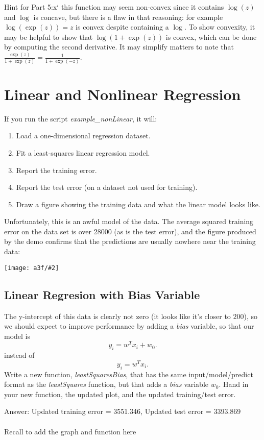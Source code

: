 \documentclass{article}
\def\ans#1{\par\gre{Answer: #1}}
\def\blu#1{{\color{blu}#1}}
\def\gre#1{{\color{gre}#1}}
\def\red#1{{\color{red}#1}}
\newcommand{\centerfig}[2]{\begin{center}\texttt{[image: a3f/\#2]}\end{center}}
\def\enum#1{\begin{enumerate}#1\end{enumerate}}
\begin{document}
Hint for Part 5:x`
this function may seem non-convex since it contains $\log(z)$ and $\log$ is concave, but there is a flaw in that reasoning: for example $\log(\exp(z))=z$ is convex despite containing a $\log$. To show convexity, it may be helpful to show that $\log(1+\exp(z))$ is convex, which can be done by computing the second derivative. It may simplify matters to note that $\frac{\exp(z)}{1+\exp(z)} = \frac{1}{1+\exp(-z)}$.

\pagebreak

\section{Linear and Nonlinear Regression}


If you run the script \emph{example\_nonLinear}, it will:
\enum{
\item Load a one-dimensional regression dataset.
\item Fit a least-squares linear regression model.
\item Report the training error.
\item Report the test error (on a dataset not used for training).
\item Draw a figure showing the training data and what the linear model looks like.
}
Unfortunately, this is an awful model of the data. The average squared training error on the data set is over 28000 (as is the test error), and the figure produced by the demo confirms that the predictions are usually nowhere near the training data:
\centerfig{.5}{leastSquares}


\subsection{Linear Regresion with Bias Variable}

The y-intercept of this data is clearly not zero (it looks like it's closer to $200$), so we should expect to improve performance by adding a \emph{bias} variable, so that our model is
\[
y_i = w^Tx_i + w_0.
\]
instead of
\[
y_i = w^Tx_i.
\]
\blu{Write a new function, \emph{leastSquaresBias}, that has the same input/model/predict format as the \emph{leastSquares} function, but that adds a \emph{bias} variable $w_0$. Hand in your new function, the updated plot, and the updated training/test error.}

\ans{Updated training error = 3551.346, Updated test error = 3393.869\\
\\
\red Recall to add the graph and function here}
\end{document}

